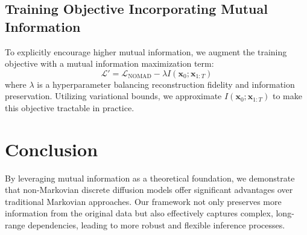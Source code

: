 \subsection{Training Objective Incorporating Mutual Information}

To explicitly encourage higher mutual information, we augment the training objective with a mutual information maximization term:
\[
\mathcal{L}' = \mathcal{L}_{\mathrm{NOMAD}} - \lambda I(\mathbf{x}_0; \mathbf{x}_{1:T})
\]
where \(\lambda\) is a hyperparameter balancing reconstruction fidelity and information preservation. Utilizing variational bounds, we approximate \(I(\mathbf{x}_0; \mathbf{x}_{1:T})\) to make this objective tractable in practice.

\section{Conclusion}

By leveraging mutual information as a theoretical foundation, we demonstrate that non-Markovian discrete diffusion models offer significant advantages over traditional Markovian approaches. Our framework not only preserves more information from the original data but also effectively captures complex, long-range dependencies, leading to more robust and flexible inference processes.

